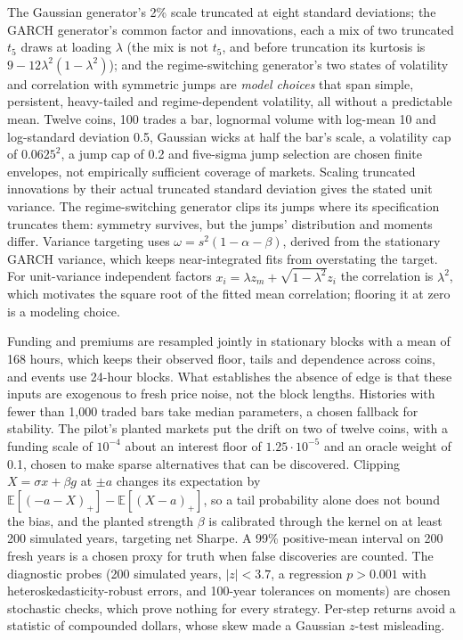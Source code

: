 \documentclass[11pt]{article}
\newcommand{\E}{\mathbb{E}}
\begin{document}
The Gaussian generator's 2\% scale truncated at eight standard deviations; the GARCH generator's common factor and innovations, each a mix of two truncated $t_5$ draws at loading $\lambda$ (the mix is not $t_5$, and before truncation its kurtosis is $9-12\lambda^2(1-\lambda^2)$); and the regime-switching generator's two states of volatility and correlation with symmetric jumps are \emph{model choices} that span simple, persistent, heavy-tailed and regime-dependent volatility, all without a predictable mean. Twelve coins, 100 trades a bar, lognormal volume with log-mean 10 and log-standard deviation 0.5, Gaussian wicks at half the bar's scale, a volatility cap of $0.0625^2$, a jump cap of 0.2 and five-sigma jump selection are chosen finite envelopes, not empirically sufficient coverage of markets. Scaling truncated innovations by their actual truncated standard deviation gives the stated unit variance. The regime-switching generator clips its jumps where its specification truncates them: symmetry survives, but the jumps' distribution and moments differ. Variance targeting uses $\omega=s^2(1-\alpha-\beta)$, derived from the stationary GARCH variance, which keeps near-integrated fits from overstating the target. For unit-variance independent factors $x_i=\lambda z_m+\sqrt{1-\lambda^2}z_i$ the correlation is $\lambda^2$, which motivates the square root of the fitted mean correlation; flooring it at zero is a modeling choice.

Funding and premiums are resampled jointly in stationary blocks with a mean of 168 hours, which keeps their observed floor, tails and dependence across coins, and events use 24-hour blocks. What establishes the absence of edge is that these inputs are exogenous to fresh price noise, not the block lengths. Histories with fewer than 1{,}000 traded bars take median parameters, a chosen fallback for stability. The pilot's planted markets put the drift on two of twelve coins, with a funding scale of $10^{-4}$ about an interest floor of $1.25\cdot10^{-5}$ and an oracle weight of 0.1, chosen to make sparse alternatives that can be discovered. Clipping $X=\sigma x+\beta g$ at $\pm a$ changes its expectation by $\E[(-a-X)_+]-\E[(X-a)_+]$, so a tail probability alone does not bound the bias, and the planted strength $\beta$ is calibrated through the kernel on at least 200 simulated years, targeting net Sharpe. A 99\% positive-mean interval on 200 fresh years is a chosen proxy for truth when false discoveries are counted. The diagnostic probes (200 simulated years, $|z|<3.7$, a regression $p>0.001$ with heteroskedasticity-robust errors, and 100-year tolerances on moments) are chosen stochastic checks, which prove nothing for every strategy. Per-step returns avoid a statistic of compounded dollars, whose skew made a Gaussian $z$-test misleading.
\end{document}
